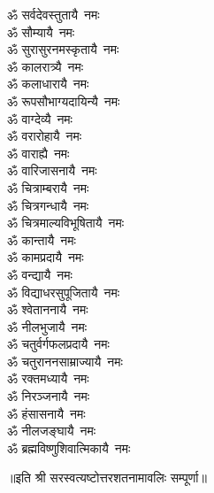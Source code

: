 \begin{multicols}{2}
\begin{flushleft}
ॐ सर्वदेवस्तुतायै~नमः\\
ॐ सौम्यायै~नमः\\
ॐ सुरासुरनमस्कृतायै~नमः\\
ॐ कालरात्र्यै~नमः\\
ॐ कलाधारायै~नमः\\
ॐ रूपसौभाग्यदायिन्यै~नमः\\
ॐ वाग्देव्यै~नमः\\
ॐ वरारोहायै~नमः\hfill{}\\
ॐ वाराह्यै~नमः\\
ॐ वारिजासनायै~नमः\\
ॐ चित्राम्बरायै~नमः\\
ॐ चित्रगन्धायै~नमः\\
ॐ चित्रमाल्यविभूषितायै~नमः\\
ॐ कान्तायै~नमः\\
ॐ कामप्रदायै~नमः\\
ॐ वन्द्यायै~नमः\\
ॐ विद्याधरसुपूजितायै~नमः\\
ॐ श्वेताननायै~नमः\hfill{}\\
ॐ नीलभुजायै~नमः\\
ॐ चतुर्वर्गफलप्रदायै~नमः\\
ॐ चतुराननसाम्राज्यायै~नमः\\
ॐ रक्तमध्यायै~नमः\\
ॐ निरञ्जनायै~नमः\\
ॐ हंसासनायै~नमः\\
ॐ नीलजङ्घायै~नमः\\
ॐ ब्रह्मविष्णुशिवात्मिकायै~नमः\\
\end{flushleft}
\end{multicols}
\centerline{॥इति श्री सरस्वत्यष्टोत्तरशतनामावलिः सम्पूर्णा॥}
